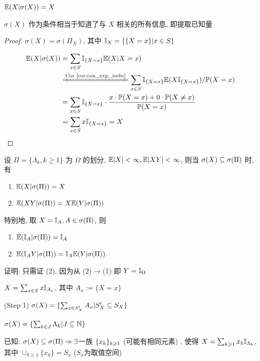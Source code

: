 \begin{example}\label{exa:extract_known}
    $\mathbb E(X|\sigma(X))=X$
\end{example}

$\sigma(X)$ 作为条件相当于知道了与 $X$ 相关的所有信息, 即提取已知量

\begin{proof}
$\sigma(X)=\sigma(\Pi_X)$, 其中 $\mathbb I_X=\{\{X=x\}|x\in S\}$

\[
\begin{aligned}
    \EE(X|\sigma(X)) &= \sum_{x\in S}\II_{\{X=x\}}\EE(X|X=x)\\
    &\xlongequal{\text{Cor \ref{cor:con_exp_indic}}}\sum_{x\in S}\II_{\{X=x\}}\EE(X\II_{\{X=x\}})/\PP(X=x)\\
    &=\sum_{x\in S}\II_{\{X=x\}}\cdot \frac{x\cdot \PP(X=x)+0\cdot \PP(X\neq x)}{\PP(X=x)}\\
    &=\sum_{x\in S}x\II_{\{X=x\}}=X
\end{aligned}
\]
\end{proof}

\begin{property}[提取已知量]\label{prt:extract_known}
设 $\Pi=\{\Lambda_k,k\geq 1\}$ 为 $\Omega$ 的划分, $\mathbb E|X|<\infty, \mathbb E|XY|<\infty$, 则当 $\sigma(X)\subseteq \sigma(\Pi)$ 时, 有
\begin{enumerate}
    \item $\mathbb E(X|\sigma(\Pi))=X$
    \item $\mathbb E(XY|\sigma(\Pi))=X\mathbb E(Y|\sigma(\Pi))$
\end{enumerate}
特别地, 取 $X=\mathbb I_A, A\in \sigma(\Pi)$, 则
\begin{enumerate}
    \item $\mathbb E(\mathbb I_A|\sigma(\Pi))=\mathbb I_A$
    \item $\mathbb E(\mathbb I_A Y|\sigma(\Pi))=\mathbb I_A \mathbb E(Y|\sigma(\Pi))$
\end{enumerate}
\end{property}

证明: 只需证 (2), 因为从 (2)$\rightarrow$(1) 即 $Y=\mathbb I_{\Omega}$

$X=\sum_{x\in S}x\mathbb I_{A_x}$, 其中 $A_x:=\{X=x\}$

(Step 1) $\sigma(X)=\{\sum_{x\in S_X'}A_x|S_X'\subseteq S_X\}$

$\sigma(X)=\{\sum_{k\in J}\Lambda_k|J\subseteq \mathbb{N}\}$

已知: $\sigma(X)\subseteq \sigma(\Pi)\Rightarrow \exists$一族 $\{{x}_{k}\}_{k \geqslant 1}$ (可能有相同元素) , 使得 $X=\sum_{k\geqslant 1}x_k\mathbb I_{\Lambda_k}$, 其中 $\cup_{k\geq 1}\{x_k\}=S_x$ ($S_x$为取值空间)

